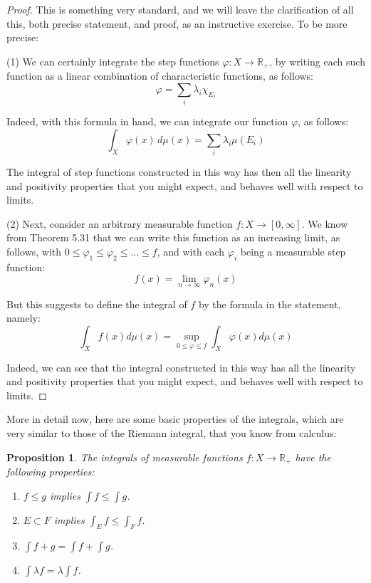 \documentclass[12pt]{amsbook}
\newtheorem{proposition}[theorem]{Proposition}
\begin{document}
\begin{proof}
This is something very standard, and we will leave the clarification of all this, both precise statement, and proof, as an instructive exercise. To be more precise:

\medskip

(1) We can certainly integrate the step functions $\varphi:X\to\mathbb R_+$, by writing each such function as a linear combination of characteristic functions, as follows:
$$\varphi=\sum_i\lambda_i\chi_{E_i}$$

Indeed, with this formula in hand, we can integrate our function $\varphi$, as follows:
$$\int_X\varphi(x)\,d\mu(x)=\sum_i\lambda_i\mu(E_i)$$

The integral of step functions constructed in this way has then all the linearity and positivity properties that you might expect, and behaves well with respect to limits.

\medskip

(2) Next, consider an arbitrary measurable function $f:X\to[0,\infty]$. We know from Theorem 5.31 that we can write this function as an increasing limit, as follows, with $0\leq\varphi_1\leq\varphi_2\leq\ldots\leq f$, and with each $\varphi_i$ being a measurable step function:
$$f(x)=\lim_{n\to\infty}\varphi_n(x)$$

But this suggests to define the integral of $f$ by the formula in the statement, namely:
$$\int_Xf(x)d\mu(x)=\sup_{0\leq\varphi\leq f}\int_X\varphi(x)d\mu(x)$$

Indeed, we can see that the integral constructed in this way has all the linearity and positivity properties that you might expect, and behaves well with respect to limits.
\end{proof}

More in detail now, here are some basic properties of the integrals, which are very similar to those of the Riemann integral, that you know from calculus:

\begin{proposition}
The integrals of measurable functions $f:X\to\mathbb R_+$ have the following properties:
\begin{enumerate}
\item $f\leq g$ implies $\int f\leq\int g$.

\item $E\subset F$ implies $\int_Ef\leq\int_Ff$.

\item $\int f+g=\int f+\int g$.

\item $\int\lambda f=\lambda\int f$.
\end{enumerate}
\end{proposition}
\end{document}
